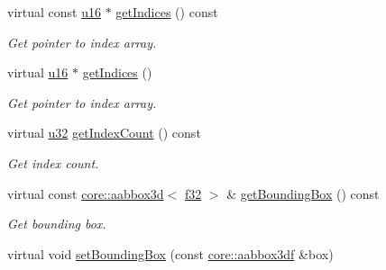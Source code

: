 \begin{DoxyCompactItemize}
virtual const \hyperlink{namespaceirr_ae9f8ec82692ad3b83c21f555bfa70bcc}{u16} $\ast$ \hyperlink{structirr_1_1scene_1_1SSkinMeshBuffer_ac5f16b3fca6454afe01939a2c1e23d08}{get\+Indices} () const
\begin{DoxyCompactList}\small\item\em Get pointer to index array. \end{DoxyCompactList}\item 
\mbox{\label{structirr_1_1scene_1_1SSkinMeshBuffer_ada6af60ed1545fd0b3372ddbb71ada5e}} 
virtual \hyperlink{namespaceirr_ae9f8ec82692ad3b83c21f555bfa70bcc}{u16} $\ast$ \hyperlink{structirr_1_1scene_1_1SSkinMeshBuffer_ada6af60ed1545fd0b3372ddbb71ada5e}{get\+Indices} ()
\begin{DoxyCompactList}\small\item\em Get pointer to index array. \end{DoxyCompactList}\item 
\mbox{\label{structirr_1_1scene_1_1SSkinMeshBuffer_adc00b4ce3b46d952575203c6e275e592}} 
virtual \hyperlink{namespaceirr_a0416a53257075833e7002efd0a18e804}{u32} \hyperlink{structirr_1_1scene_1_1SSkinMeshBuffer_adc00b4ce3b46d952575203c6e275e592}{get\+Index\+Count} () const
\begin{DoxyCompactList}\small\item\em Get index count. \end{DoxyCompactList}\item 
\mbox{\label{structirr_1_1scene_1_1SSkinMeshBuffer_a350535b406a7607bd392d07e5c3f9401}} 
virtual const \hyperlink{classirr_1_1core_1_1aabbox3d}{core\+::aabbox3d}$<$ \hyperlink{namespaceirr_a0277be98d67dc26ff93b1a6a1d086b07}{f32} $>$ \& \hyperlink{structirr_1_1scene_1_1SSkinMeshBuffer_a350535b406a7607bd392d07e5c3f9401}{get\+Bounding\+Box} () const
\begin{DoxyCompactList}\small\item\em Get bounding box. \end{DoxyCompactList}\item 
\mbox{\label{structirr_1_1scene_1_1SSkinMeshBuffer_ab4d3b6c78a4a3cfe368af4c89350497f}} 
virtual void \hyperlink{structirr_1_1scene_1_1SSkinMeshBuffer_ab4d3b6c78a4a3cfe368af4c89350497f}{set\+Bounding\+Box} (const \hyperlink{namespaceirr_1_1core_a60f4b4c744aba55f10530d503c6ecb04}{core\+::aabbox3df} \&box)

\end{DoxyCompactItemize}

